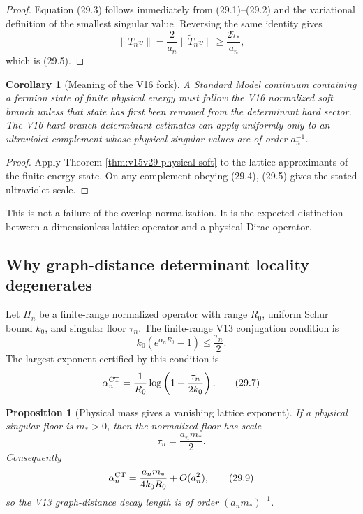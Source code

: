 \documentclass[11pt]{article}
\newtheorem{proposition}[theorem]{Proposition}
\newtheorem{corollary}[theorem]{Corollary}
\theoremstyle{remark}
\begin{document}
\begin{proof}
Equation (29.3) follows immediately from (29.1)--(29.2) and the
variational definition of the smallest singular value.  Reversing
the same identity gives
\[
 \|T_nv\|=\frac2{a_n}\|\widetilde T_nv\|
 \ge\frac{2\widetilde\tau_*}{a_n},
\]
which is (29.5).
\end{proof}

\begin{corollary}[Meaning of the V16 fork]
\label{cor:v15v29-fork}
A Standard Model continuum containing a fermion state of finite
physical energy must follow the V16 normalized soft branch unless
that state has first been removed from the determinant hard sector.
The V16 hard-branch determinant estimates can apply uniformly only
to an ultraviolet complement whose physical singular values are
of order \(a_n^{-1}\).
\end{corollary}

\begin{proof}
Apply Theorem \ref{thm:v15v29-physical-soft} to the lattice
approximants of the finite-energy state.  On any complement obeying
(29.4), (29.5) gives the stated ultraviolet scale.
\end{proof}

This is not a failure of the overlap normalization.  It is the
expected distinction between a dimensionless lattice operator and a
physical Dirac operator.

\subsection{Why graph-distance determinant locality degenerates}

Let \(H_n\) be a finite-range normalized operator with range
\(R_0\), uniform Schur bound \(k_0\), and singular floor
\(\tau_n\).  The finite-range V13 conjugation condition is
\[
 k_0(e^{\alpha_nR_0}-1)\le\frac{\tau_n}{2}.                 \tag{29.6}
\]
The largest exponent certified by this condition is
\[
 \alpha_n^{\rm CT}
 =
 \frac1{R_0}\log\left(1+\frac{\tau_n}{2k_0}\right).          \tag{29.7}
\]

\begin{proposition}[Physical mass gives a vanishing lattice
exponent]
\label{prop:v15v29-exponent}
If a physical singular floor is \(m_*>0\), then the normalized floor
has scale
\[
 \tau_n=\frac{a_nm_*}{2}.                                   \tag{29.8}
\]
Consequently
\[
 \alpha_n^{\rm CT}
 =
 \frac{a_nm_*}{4k_0R_0}+O(a_n^2),                           \tag{29.9}
\]
so the V13 graph-distance decay length is of order
\((a_nm_*)^{-1}\).
\end{proposition}
\end{document}
